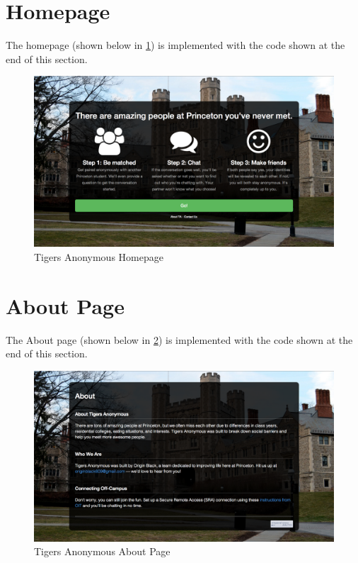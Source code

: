 \section{Homepage}

The homepage (shown below in \ref{fig:TAHomepage}) is implemented with the code shown at the end of this section.

\begin{figure}[h]
\centering
\includegraphics[trim= 35mm 0mm 35mm 0mm, clip, scale=0.25]{./Figures/TAHomepage}
\caption{Tigers Anonymous Homepage}
\label{fig:TAHomepage}
\end{figure}

\lstset{language=HTML}


\section{About Page}

The About page (shown below in \ref{fig:TAAbout}) is implemented with the code shown at the end of this section.

\begin{figure}[h]
\centering
\includegraphics[trim= 35mm 0mm 35mm 0mm, clip, scale=0.25]{./Figures/TAAbout}
\caption{Tigers Anonymous About Page}
\label{fig:TAAbout}
\end{figure}

